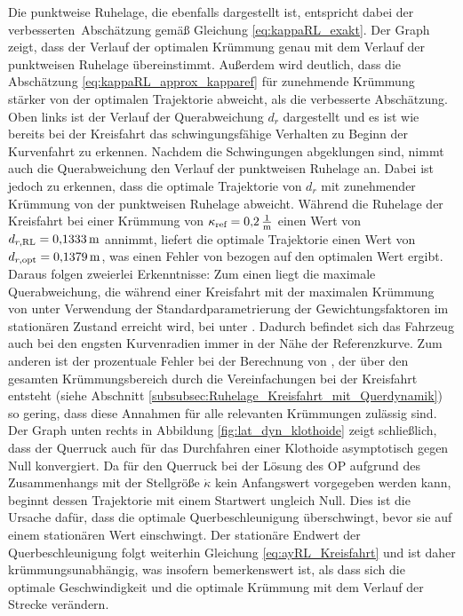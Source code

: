 Die punktweise Ruhelage, die ebenfalls dargestellt ist, entspricht dabei der \glqq verbesserten\grqq~Abschätzung gemäß Gleichung \eqref{eq:kappaRL_exakt}. Der Graph zeigt, dass der Verlauf der optimalen Krümmung genau mit dem Verlauf der punktweisen Ruhelage übereinstimmt. Außerdem wird deutlich, dass die Abschätzung \eqref{eq:kappaRL_approx_kapparef} für zunehmende Krümmung stärker von der optimalen Trajektorie abweicht, als die verbesserte Abschätzung. Oben links ist der Verlauf der Querabweichung $d_r$ dargestellt und es ist wie bereits bei der Kreisfahrt das schwingungsfähige Verhalten zu Beginn der Kurvenfahrt zu erkennen. Nachdem die Schwingungen abgeklungen sind, nimmt auch die Querabweichung den Verlauf der punktweisen Ruhelage an. Dabei ist jedoch zu erkennen, dass die optimale Trajektorie von $d_r$ mit zunehmender Krümmung von der punktweisen Ruhelage abweicht. Während die Ruhelage der Kreisfahrt bei einer Krümmung von $\kappa_{\textrm{ref}} = 0{,}2\,\mathrm{\frac{\mathrm{1}}{\mathrm{m}}}$ einen Wert von $d_{r,\textrm{RL}} = 0{,}1333\,\mathrm{m}$ annimmt, liefert die optimale Trajektorie einen Wert von $d_{r,\textrm{opt}} = 0{,}1379\,\mathrm{m}$, was einen Fehler von  bezogen auf den optimalen Wert ergibt. Daraus folgen zweierlei Erkenntnisse: Zum einen liegt die maximale Querabweichung, die während einer Kreisfahrt mit der maximalen Krümmung von  unter Verwendung der Standardparametrierung der Gewichtungsfaktoren im stationären Zustand erreicht wird, bei unter . Dadurch befindet sich das Fahrzeug auch bei den engsten Kurvenradien immer in der Nähe der Referenzkurve. Zum anderen ist der prozentuale Fehler bei der Berechnung von \drRL, der über den gesamten Krümmungsbereich durch die Vereinfachungen bei der Kreisfahrt entsteht (siehe Abschnitt \ref{subsubsec:Ruhelage_Kreisfahrt_mit_Querdynamik}) so gering, dass diese Annahmen für alle relevanten Krümmungen zulässig sind. Der Graph unten rechts in Abbildung \ref{fig:lat_dyn_klothoide} zeigt schließlich, dass der Querruck auch für das Durchfahren einer Klothoide asymptotisch gegen Null konvergiert. Da für den Querruck bei der Lösung des \gls{OP} aufgrund des Zusammenhangs mit der Stellgröße $\dot{\kappa}$ kein Anfangswert vorgegeben werden kann, beginnt dessen Trajektorie mit einem Startwert ungleich Null. Dies ist die Ursache dafür, dass die optimale Querbeschleunigung überschwingt, bevor sie auf einem stationären Wert einschwingt. Der stationäre Endwert der Querbeschleunigung folgt weiterhin Gleichung \eqref{eq:ayRL_Kreisfahrt} und ist daher krümmungsunabhängig, was insofern bemerkenswert ist, als dass sich die optimale Geschwindigkeit und die optimale Krümmung mit dem Verlauf der Strecke verändern. 
